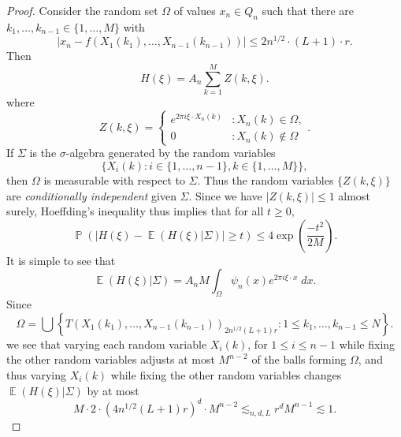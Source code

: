 \documentclass[dvipsnames,letterpaper,12pt]{article}
\numberwithin{equation}{section}
\numberwithin{theorem}{section}
\DeclareMathOperator{\EE}{\mathbb{E}}
\DeclareMathOperator{\PP}{\mathbb{P}}
\begin{document}
\begin{proof}
    Consider the random set $\Omega$ of values $x_n \in Q_n$ such that there are $k_1,\dots,k_{n-1} \in \{ 1,\dots,M \}$ with
    \begin{equation}
        |x_n - f(X_1(k_1),\dots,X_{n-1}(k_{n-1}))| \leq 2 n^{1/2} \cdot (L+1) \cdot r.
    \end{equation}
    Then
    \begin{equation}
        H(\xi) = A_n \sum_{k = 1}^M Z(k,\xi).
    \end{equation}
    where
    \[ Z(k,\xi) = \begin{cases} e^{2 \pi i \xi \cdot X_n(k)} &: X_n(k) \in \Omega, \\ 0 &: X_n(k) \not \in \Omega \end{cases}. \]
    If $\Sigma$ is the $\sigma$-algebra generated by the random variables
    \[ \{ X_i(k) : i \in \{ 1, \dots, n-1 \}, k \in \{ 1, \dots, M \} \}, \]
    then $\Omega$ is measurable with respect to $\Sigma$. Thus the random variables $\{ Z(k,\xi) \}$ are \emph{conditionally independent} given $\Sigma$. Since we have $|Z(k,\xi)| \leq 1$ almost surely, Hoeffding's inequality thus implies that for all $t \geq 0$,
    \begin{equation} \label{equationCOIJCOIJX1232312}
        \PP \left( \left| H(\xi) - \EE(H(\xi)|\Sigma) \right| \geq t \right) \leq 4 \exp \left( \frac{-t^2}{2M} \right).
    \end{equation}
    It is simple to see that
    \begin{equation}
        \EE(H(\xi) | \Sigma) = A_n M \int_\Omega \psi_n(x) e^{2 \pi i \xi \cdot x}\; dx.
    \end{equation}
    Since
    \begin{equation}
        \Omega = \bigcup \left\{ T(X_1(k_1),\dots,X_{n-1}(k_{n-1}))_{2 n^{1/2} (L+1) r} : 1 \leq k_1,\dots,k_{n-1} \leq N \right\}.
    \end{equation}
    we see that varying each random variable $X_i(k)$, for $1 \leq i \leq n-1$ while fixing the other random variables adjusts at most $M^{n-2}$ of the balls forming $\Omega$, and thus varying $X_i(k)$ while fixing the other random variables changes $\EE(H(\xi)|\Sigma)$ by at most
    \begin{equation}
        M \cdot 2 \cdot (4n^{1/2} (L+1) r)^d \cdot M^{n-2} \lesssim_{n,d,L} r^d M^{n-1} \lesssim 1.
    \end{equation}

\end{proof}
\end{document}
